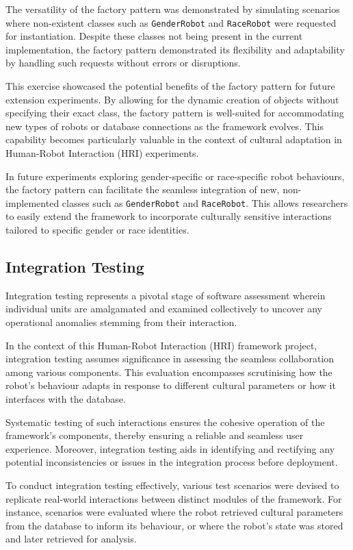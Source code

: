 The versatility of the factory pattern was demonstrated by simulating scenarios where non-existent classes such as \texttt{GenderRobot} and \texttt{RaceRobot} were requested for instantiation. Despite these classes not being present in the current implementation, the factory pattern demonstrated its flexibility and adaptability by handling such requests without errors or disruptions.

This exercise showcased the potential benefits of the factory pattern for future extension experiments. By allowing for the dynamic creation of objects without specifying their exact class, the factory pattern is well-suited for accommodating new types of robots or database connections as the framework evolves. This capability becomes particularly valuable in the context of cultural adaptation in Human-Robot Interaction (HRI) experiments.

In future experiments exploring gender-specific or race-specific robot behaviours, the factory pattern can facilitate the seamless integration of new, non-implemented classes such as \texttt{GenderRobot} and \texttt{RaceRobot}. This allows researchers to easily extend the framework to incorporate culturally sensitive interactions tailored to specific gender or race identities.

\subsection{Integration Testing}

Integration testing represents a pivotal stage of software assessment wherein individual units are amalgamated and examined collectively to uncover any operational anomalies stemming from their interaction.

In the context of this Human-Robot Interaction (HRI) framework project, integration testing assumes significance in assessing the seamless collaboration among various components. This evaluation encompasses scrutinising how the robot's behaviour adapts in response to different cultural parameters or how it interfaces with the database.

Systematic testing of such interactions ensures the cohesive operation of the framework's components, thereby ensuring a reliable and seamless user experience. Moreover, integration testing aids in identifying and rectifying any potential inconsistencies or issues in the integration process before deployment.

To conduct integration testing effectively, various test scenarios were devised to replicate real-world interactions between distinct modules of the framework. For instance, scenarios were evaluated where the robot retrieved cultural parameters from the database to inform its behaviour, or where the robot's state was stored and later retrieved for analysis.